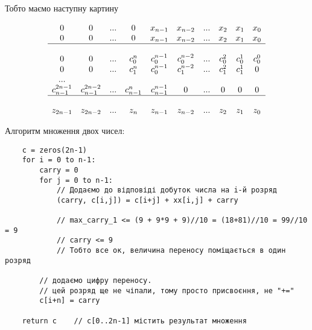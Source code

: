 \documentclass[11pt, a4paper]{article} %
\begin{document}
Тобто маємо наступну картину

$$\begin{matrix}
    0 & 0 & ... & 0 & x_{n-1} & x_{n-2} & ... & x_2 & x_1 & x_0 \\
    0 & 0 & ... & 0 & x_{n-1} & x_{n-2} & ... & x_2 & x_1 & x_0 \\
    \hline \\
    0 & 0 & ... & c_0^{n} & c_0^{n-1} & c_0^{n-2} & ... & c_0^2 & c_0^1 & c_0^0 \\
    0 & 0 & ... & c_1^{n} & c_0^{n-1} & c_1^{n-2} & ... & c_1^2 & c_1^1 & 0 \\
    ...\\
    c_{n-1}^{2n-1} & c_{n-1}^{2n-2} & ... & c_{n-1}^{n} & c_{n-1}^{n-1} & 0 & ... & 0 & 0 & 0 \\
    \hline \\
    z_{2n-1} & z_{2n-2} & ... & z_n & z_{n-1} & z_{n-2} & ... & z_2 & z_1 & z_0
\end{matrix}$$





\pagebreak

Алгоритм множення двох чисел:
\begin{lstlisting}
    c = zeros(2n-1)
    for i = 0 to n-1:
        carry = 0
        for j = 0 to n-1:
            // Додаємо до відповіді добуток числа на i-й розряд
            (carry, c[i,j]) = c[i+j] + xx[i,j] + carry

            // max_carry_1 <= (9 + 9*9 + 9)//10 = (18+81)//10 = 99//10 = 9
            // carry <= 9
            // Тобто все ок, величина переносу поміщається в один розряд

        // додаємо цифру переносу. 
        // цей розряд ще не чіпали, тому просто присвоєння, не "+="
        c[i+n] = carry

    return c    // c[0..2n-1] містить результат множення
\end{lstlisting}
\end{document}
